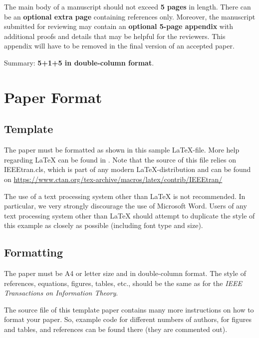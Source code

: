 \documentclass[conference,a4paper]{IEEEtran}
\begin{document}
The main body of a manuscript should not exceed \textbf{5 pages} in
length. There can be an \textbf{optional extra page} containing
references only. Moreover, the manuscript submitted for reviewing may
contain an \textbf{optional 5-page appendix} with additional proofs
and details that may be helpful for the reviewers. This appendix will
have to be removed in the final version of an accepted paper.

Summary: \textbf{5+1+5 in double-column format}.


\section{Paper Format}
\label{sec:paper-format}

\subsection{Template}
\label{sec:template}

The paper must be formatted as shown in this sample
\LaTeX{}-file. More help regarding \LaTeX{} can be found in
\cite{Laport:LaTeX, GMS:LaTeXComp, oetiker_latex, typesetmoser,
  shell15}. Note that the source of this file relies on IEEEtran.cls,
which is part of any modern \LaTeX{}-distribution and can be found on
\url{https://www.ctan.org/tex-archive/macros/latex/contrib/IEEEtran/}

The use of a text processing system other than \LaTeX{} is not
recommended. In particular, we very strongly discourage the use of
Microsoft Word.  Users of any text processing system other than
\LaTeX{} should attempt to duplicate the style of this example as
closely as possible (including font type and size).


\subsection{Formatting}
\label{sec:formatting}

The paper must be A4 or letter size and in double-column format.  The
style of references, equations, figures, tables, etc., should be the
same as for the \emph{IEEE Transactions on Information Theory}.

The source file of this template paper contains many more instructions
on how to format your paper. So, example code for different numbers of
authors, for figures and tables, and references can be found there
(they are commented out).

\end{document}
